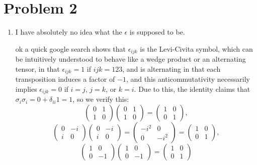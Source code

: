 \documentclass[11pt, letterpaper]{article}
\begin{document}
\section*{Problem 2}
\begin{enumerate}
	\item I have absolutely no idea what the $\epsilon $ is supposed to be.

		ok a quick google search shows that $\epsilon_{ijk} $ is the Levi-Civita symbol, which can be intuitively understood to behave like a wedge product or an alternating tensor, in that $\epsilon_{ijk} =1$ if $ijk=123$, and is alternating in that each transposition induces a factor of $-1$, and this anticommutativity necessarily implies $\epsilon_{ijk} =0$ if $i=j$, $j=k$, or $k=i$. Due to this, the identity claims that $\sigma_i\sigma_i=0+\delta_{ii}1=1 $, so we verify this:
		\[
			\begin{pmatrix}
			0 & 1 \\
			1 & 0
			\end{pmatrix}\begin{pmatrix}
			0 & 1 \\
			1 & 0
			\end{pmatrix}=\begin{pmatrix}
			1 & 0 \\
			0 & 1
			\end{pmatrix},
		\]
		\[
			\begin{pmatrix}
			0 & -i \\
			i & 0
			\end{pmatrix}\begin{pmatrix}
			0 & -i \\
			i & 0
			\end{pmatrix}=\begin{pmatrix}
			-i^2 & 0 \\
			0 & -i^2
			\end{pmatrix}=\begin{pmatrix}
			1 & 0 \\
			0 & 1
			\end{pmatrix}
		,\]
		\[
			\begin{pmatrix}
			1 & 0 \\
			0 & -1
			\end{pmatrix}\begin{pmatrix}
			1 & 0 \\
			0 & -1
			\end{pmatrix}=\begin{pmatrix}
			1 & 0 \\
			0 & 1
			\end{pmatrix}
\]
\end{enumerate}
\end{document}
